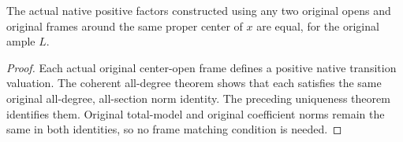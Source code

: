 \begin{corollary}\label{cor:native-tc-original-frame-factor-independence}
\leanok
{}
The actual native positive factors constructed using any two
original opens and original frames around the same proper
center of $x$ are equal, for the original ample $L$.
\end{corollary}
\begin{proof}
Each actual original center-open frame defines a positive
native transition valuation. The coherent all-degree theorem
shows that each satisfies the same original all-degree,
all-section norm identity. The preceding uniqueness theorem
identifies them. Original total-model and original coefficient
norms remain the same in both identities, so no frame matching
condition is needed.
\end{proof}

